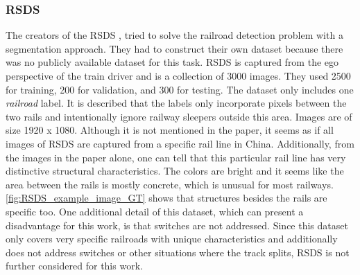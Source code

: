 \clearpage

\subsubsection{RSDS}
\label{subsubsec:RSDS}
The creators of the \ac{RSDS} \cite{railNet2019}, tried to solve the railroad detection problem with a segmentation approach.
They had to construct their own dataset because there was no publicly available dataset for this task. \ac{RSDS} is captured from the ego perspective of the train driver and is a collection of 3000 images. They used 2500 for training, 200 for validation, and 300 for testing. The dataset only includes one \textit{railroad} label. It is described that the labels only incorporate pixels between the two rails and intentionally ignore railway sleepers outside this area. Images are of size 1920 x 1080.
Although it is not mentioned in the paper, it seems as if all images of \ac{RSDS} are captured from a specific rail line in China. Additionally, from the images in the paper alone, one can tell that this particular rail line has very distinctive structural characteristics. The colors are bright and it seems like the area between the rails is mostly concrete, which is unusual for most railways. \autoref{fig:RSDS_example_image_GT} shows that structures besides the rails are specific too.
One additional detail of this dataset, which can present a disadvantage for this work, is that switches are not addressed.
Since this dataset only covers very specific railroads with unique characteristics and additionally does not address switches or other situations where the track splits, \ac{RSDS} is not further considered for this work.

